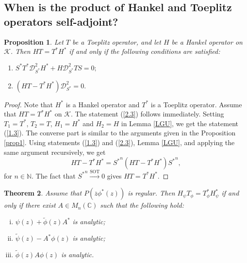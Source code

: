 \documentclass[12pt, reqno]{amsart}
\newtheorem{theorem}{Theorem}[section]
\newtheorem{proposition}[theorem]{Proposition}
\theoremstyle{definition}
\theoremstyle{remark}
\numberwithin{equation}{section}
\newcommand{\ck}{\mathcal{K}}
\begin{document}
    \subsection{When is the product of Hankel and Toeplitz operators self-adjoint?}
    \begin{proposition}\label{prop3}
        Let $T$ be a Toeplitz operator, and let $H$ be a Hankel operator on $\ck$. Then $HT=T^*H^*$ if and only if the following conditions are satisfied:
        \begin{enumerate}
            \item $S^*T^*\mathcal{D}^2_{S^*} H^*+H\mathcal{D}^2_{S^*} TS=0;$\label{1.3}
            \item $(HT-T^*H^*)\mathcal{D}^2_{S^*}=0.$\label{2.3}
        \end{enumerate}
        \end{proposition}
        \begin{proof}
             Note that $H^*$ is a Hankel operator and $T^*$ is a Toeplitz operator. Assume that $HT=T^*H^*$ on $\ck$. The statement (\ref{2.3}) follows immediately. Setting $T_1=T^*$, $T_2=T$, $H_1=H^*$ and $H_2=H$ in Lemma \ref{LGU}, we get the statement (\ref{1.3}). The converse part is similar to the arguments given in the Proposition \ref{prop1}. Using statements (\ref{1.3}) and (\ref{2.3}), Lemma \ref{LGU}, and applying the same argument recursively, we get
             $$
                HT-T^*H^*={S^*}^n(HT-T^*H^*){S^*}^n,
             $$
             for $n \in \mathbb{N}.$ The fact that ${S^*}^n \xrightarrow{\text{SOT}} 0$ gives $HT=T^*H^*.$
        \end{proof}
    \begin{theorem}\label{Th3}
        Assume that $P(\overline z \phi^*(z))$ is regular. Then $H_\psi T_\phi =T_\phi^*H_\psi^*$  if and only if there exist $A\in M_n(\mathbb{C})$ such that the following hold:
        \begin{enumerate}[(i)]
            \item $\psi(z)+\tilde\phi(z)A^*$ is analytic;\label{3i}
            \item $\tilde\psi(z)-A^*\phi(z)$ is analytic;\label{3ii}
            \item $\tilde \phi(z)A\phi(z)$ is analytic.\label{3iii}
        \end{enumerate}
        \end{theorem}
\end{document}
